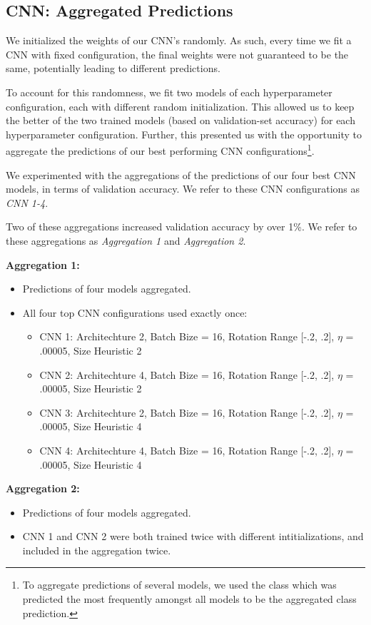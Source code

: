 \documentclass[letterpaper, 10 pt, conference]{ieeeconf}
\begin{document}
\subsection{CNN: Aggregated Predictions} 

We initialized the weights of our CNN's randomly. As such, every time we fit a CNN with fixed configuration, the final weights were not guaranteed to be the same, potentially leading to different predictions. 

To account for this randomness, we fit two models of each hyperparameter configuration, each with different random initialization. This allowed us to keep the better of the two trained models (based on validation-set accuracy) for each hyperparameter configuration. Further, this presented us with the opportunity to aggregate the predictions of our best performing CNN configurations\footnote{To aggregate predictions of several models, we used the class which was predicted the most frequently amongst all models to be the aggregated class prediction.}.

We experimented with the aggregations of the predictions of our four best CNN models, in terms of validation accuracy. We refer to these CNN configurations as \emph{CNN 1-4}. 

Two of these aggregations increased validation accuracy by over 1\%. We refer to these aggregations as \emph{Aggregation 1} and \emph{Aggregation 2}. 

\textbf{Aggregation 1:}
\begin{itemize}
\item Predictions of four models aggregated.
\item All four top CNN configurations used exactly once:
	\begin{itemize}
    \item CNN 1: Architechture 2, Batch Bize = 16, Rotation Range [-.2, .2], $\eta$ = .00005, Size Heuristic 2
	\item CNN 2: Architechture 4, Batch Bize = 16, Rotation Range [-.2, .2], $\eta$ = .00005, Size Heuristic 2
	\item CNN 3: Architechture 2, Batch Bize = 16, Rotation Range [-.2, .2], $\eta$ = .00005, Size Heuristic 4
	\item CNN 4: Architechture 4, Batch Bize = 16, Rotation Range [-.2, .2], $\eta$ = .00005, Size Heuristic 4
	\end{itemize}
\end{itemize}
\textbf{Aggregation 2:}
\begin{itemize}
\item Predictions of four models aggregated.
\item CNN 1 and CNN 2 were both trained twice with different intitializations, and included in the aggregation twice.
\end{itemize}
\end{document}
